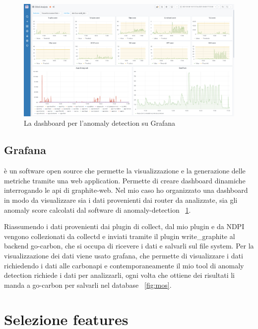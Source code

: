 \begin{figure}[h]
    \label{fig:grafana}
    \includegraphics[width=\hsize]{images/my_work/grafana_dashboard.png}
    \caption{La dashboard per l'anomaly detection su Grafana}
    \centering
\end{figure}

\subsection{Grafana} è un software open source che permette la visualizzazione e la generazione delle metriche tramite una web application. Permette di creare dashboard dinamiche interrogando le api di graphite-web. Nel mio caso ho organizzato una dashboard in modo da visualizzare sia i dati provenienti dai router da analizzate, sia gli anomaly score calcolati dal software di anomaly-detection ~\ref{fig:grafana}.


Riassumendo i dati provenienti dai plugin di collect, dal mio plugin e da NDPI vengono collezionati da collectd e inviati tramite il plugin write\_graphite al backend go-carbon, che si occupa di ricevere i dati e salvarli sul file system. Per la visualizzazione dei dati viene usato grafana, che permette di visualizzare i dati richiedendo i dati alle carbonapi e contemporaneamente il mio tool di anomaly detection richiede i dati per analizzarli, ogni volta che ottiene dei risultati li manda a go-carbon per salvarli nel database ~\ref{fig:mos}.


\section{Selezione features}


